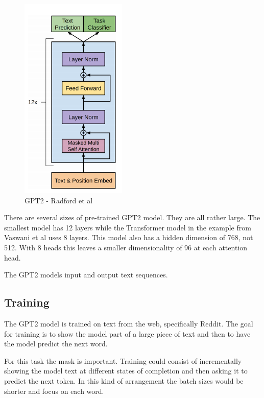 \begin{figure}[H]
	\begin{center}
		
		
		\includegraphics[scale=3.0]{diagram-mat05}
	\end{center}
	\caption[Generative Pre-training Transformer 2 ]{GPT2 - Radford et al \cite{radford2018improving}}
	

\end{figure}

There are several sizes of pre-trained GPT2 model. They are all rather large. The smallest model has 12 layers while the Transformer model in the example from Vaswani et al \cite{Vaswani2017AttentionIA} uses 8 layers. This model also has a hidden dimension of 768, not 512. With 8 heads this leaves a smaller dimensionality of 96 at each attention head. 

The GPT2 models input and output text sequences.


\subsection{Training}

The GPT2 model is trained on text from the web, specifically Reddit. The goal for training is to show the model part of a large piece of text and then to have the model predict the next word. 

For this task the mask is important. Training could consist of incrementally showing the model text at different states of completion and then asking it to predict the next token. In this kind of arrangement the batch sizes would be shorter and focus on each word. 

